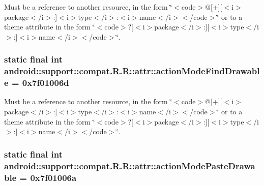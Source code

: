 Must be a reference to another resource, in the form \char`\"{}$<$code$>$@\mbox{[}+\mbox{]}\mbox{[}$<$i$>$package$<$/i$>$:\mbox{]}$<$i$>$type$<$/i$>$:$<$i$>$name$<$/i$>$$<$/code$>$\char`\"{} or to a theme attribute in the form \char`\"{}$<$code$>$?\mbox{[}$<$i$>$package$<$/i$>$:\mbox{]}\mbox{[}$<$i$>$type$<$/i$>$:\mbox{]}$<$i$>$name$<$/i$>$$<$/code$>$\char`\"{}. \hypertarget{classandroid_1_1support_1_1compat_1_1_r_1_1attr_23cf7c9ce0e11c3fe8b6181b309c9365}{
\subsubsection[{actionModeFindDrawable}]{\setlength{\rightskip}{0pt plus 5cm}static final int android::support::compat.R.R::attr::actionModeFindDrawable = 0x7f01006d}}
\label{classandroid_1_1support_1_1compat_1_1_r_1_1attr_23cf7c9ce0e11c3fe8b6181b309c9365}


Must be a reference to another resource, in the form \char`\"{}$<$code$>$@\mbox{[}+\mbox{]}\mbox{[}$<$i$>$package$<$/i$>$:\mbox{]}$<$i$>$type$<$/i$>$:$<$i$>$name$<$/i$>$$<$/code$>$\char`\"{} or to a theme attribute in the form \char`\"{}$<$code$>$?\mbox{[}$<$i$>$package$<$/i$>$:\mbox{]}\mbox{[}$<$i$>$type$<$/i$>$:\mbox{]}$<$i$>$name$<$/i$>$$<$/code$>$\char`\"{}. \hypertarget{classandroid_1_1support_1_1compat_1_1_r_1_1attr_970f00e860f4755cc9e5b5481c25dfa4}{
\subsubsection[{actionModePasteDrawable}]{\setlength{\rightskip}{0pt plus 5cm}static final int android::support::compat.R.R::attr::actionModePasteDrawable = 0x7f01006a}}
\label{classandroid_1_1support_1_1compat_1_1_r_1_1attr_970f00e860f4755cc9e5b5481c25dfa4}



